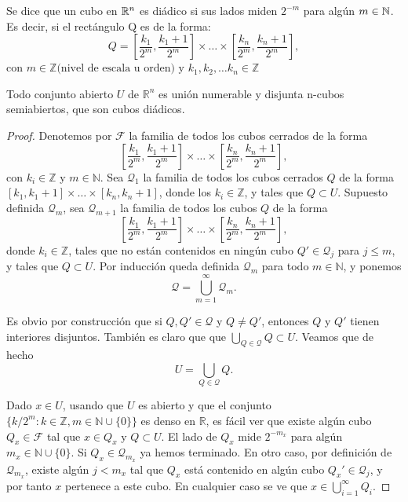 \label{Cubo Diádico}
\begin{definición}
Se dice que un cubo en $\mathbb{R}^n$ es diádico si sus lados miden $2^{-m}$ para algún $m \in \mathbb{N}$.
Es decir, si el rectángulo Q es de la forma:
\[Q = \left[\frac{k_1}{2^m}, \frac{k_1 + 1}{2^m}\right] \times \dots \times \left[\frac{k_n}{2^m}, \frac{k_n + 1}{2^m}\right],\]
con $m \in \mathbb{Z} \text{(nivel de escala u orden) y } k_1, k_2, \dots k_n
    \in \mathbb{Z}$
\end{definición}

\begin{teorema}
    Todo conjunto abierto $U$ de $\mathbb{R}^n$ es unión numerable y disjunta n-cubos semiabiertos, que son cubos diádicos.
\end{teorema}

\begin{proof}
    Denotemos por $\mathcal{F}$ la familia de todos los cubos cerrados de la forma
    \[
        \left[\frac{k_1}{2^m}, \frac{k_1 + 1}{2^m}\right] \times \dots \times \left[\frac{k_n}{2^m}, \frac{k_n + 1}{2^m}\right],
    \]
    con $k_i \in \mathbb{Z}$ y $m \in \mathbb{N}$. Sea $\mathcal{Q}_1$ la familia
    de todos los cubos cerrados $Q$ de la forma $[k_1, k_1 + 1] \times \dots \times
        [k_n, k_n + 1]$, donde los $k_i \in \mathbb{Z}$, y tales que $Q \subset U$.
    Supuesto definida $\mathcal{Q}_m$, sea $\mathcal{Q}_{m+1}$ la familia de todos
    los cubos $Q$ de la forma
    \[
        \left[\frac{k_1}{2^m}, \frac{k_1+1}{2^m}\right] \times \dots \times \left[\frac{k_n}{2^m}, \frac{k_n+1}{2^m}\right],
    \]
    donde $k_i \in \mathbb{Z}$, tales que no están contenidos en ningún cubo $Q'
        \in \mathcal{Q}_j$ para $j \leq m$, y tales que $Q \subset U$. Por inducción
    queda definida $\mathcal{Q}_m$ para todo $m \in \mathbb{N}$, y ponemos
    \[
        \mathcal{Q} = \bigcup_{m=1}^{\infty} \mathcal{Q}_m.
    \]

    Es obvio por construcción que si $Q, Q' \in \mathcal{Q}$ y $Q \neq Q'$,
    entonces $Q$ y $Q'$ tienen interiores disjuntos. También es claro que que
    $\bigcup_{Q \in \mathcal{Q}} Q \subset U$. Veamos que de hecho
    \[
        U = \bigcup_{Q \in \mathcal{Q}} Q.
    \]

    Dado $x \in U$, usando que $U$ es abierto y que el conjunto $\{k/2^m : k \in
        \mathbb{Z}, m \in \mathbb{N} \cup \{0\}\}$ es denso en $\mathbb{R}$, es fácil
    ver que existe algún cubo $Q_x \in \mathcal{F}$ tal que $x \in Q_x$ y $Q
        \subset U$. El lado de $Q_x$ mide $2^{-m_x}$ para algún $m_x \in \mathbb{N}
        \cup \{0\}$. Si $Q_x \in \mathcal{Q}_{m_x}$ ya hemos terminado. En otro caso,
    por definición de $\mathcal{Q}_{m_x}$, existe algún $j < m_x$ tal que $Q_x$
    está contenido en algún cubo $Q_x' \in \mathcal{Q}_j$, y por tanto $x$
    pertenece a este cubo. En cualquier caso se ve que $x \in
        \bigcup_{i=1}^{\infty} Q_i$.
\end{proof}

